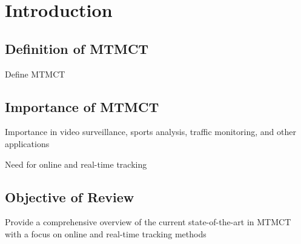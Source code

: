 \chapter{Introduction}\label{chap:introduction}

\section{Definition of MTMCT}\label{sec:definition_of_mtmct}
Define MTMCT

\section{Importance of MTMCT}\label{sec:importance_of_mtmct}
Importance in video surveillance, sports analysis, traffic monitoring, and other applications

Need for online and real-time tracking

\section{Objective of Review}\label{sec:objective_of_review}
Provide a comprehensive overview of the current state-of-the-art in MTMCT with a focus on online and real-time tracking methods